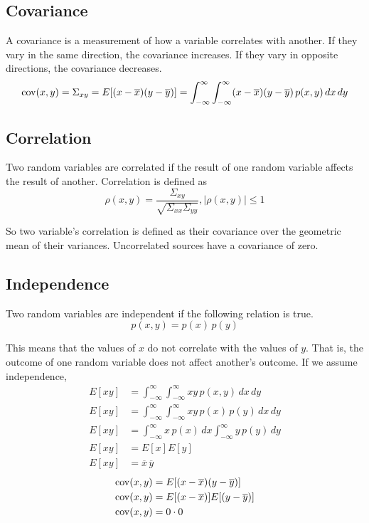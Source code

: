 \subsection{Covariance}

A covariance is a measurement of how a variable correlates with another. If they
vary in the same direction, the covariance increases. If they vary in opposite
directions, the covariance decreases.
\begin{equation*}
  \operatorname{cov}(x, y) = \Sigma_{xy} = E[(x - \overline{x})(y - \overline{y})] =
    \int_{-\infty}^\infty \int_{-\infty}^\infty (x - \overline{x})
    (y - \overline{y}) \,p(x, y) \,dx \,dy \\
\end{equation*}

\subsection{Correlation}

Two random variables are correlated if the result of one random variable affects
the result of another. Correlation is defined as
\begin{equation*}
  \rho(x, y) = \frac{\Sigma_{xy}}{\sqrt{\Sigma_{xx}\Sigma_{yy}}}, |\rho(x, y)|
    \leq 1
\end{equation*}

So two variable's correlation is defined as their covariance over the geometric
mean of their variances. Uncorrelated sources have a covariance of zero.

\subsection{Independence}

Two random variables are independent if the following relation is true.
\begin{equation*}
  p(x, y) = p(x) \,p(y)
\end{equation*}

This means that the values of $x$ do not correlate with the values of $y$. That
is, the outcome of one random variable does not affect another's outcome. If we
assume independence,
\begin{align*}
  E[xy] &= \int_{-\infty}^\infty \int_{-\infty}^\infty xy \,p(x, y) \,dx \,dy \\
  E[xy] &= \int_{-\infty}^\infty \int_{-\infty}^\infty xy \,p(x) \,p(y) \,dx
    \,dy \\
  E[xy] &= \int_{-\infty}^\infty x \,p(x) \,dx \int_{-\infty}^\infty y \,p(y)
    \,dy \\
  E[xy] &= E[x]E[y] \\
  E[xy] &= \overline{x}\,\overline{y}
\end{align*}
\begin{align*}
  \operatorname{cov}(x, y) &= E[(x - \overline{x})(y - \overline{y})] \\
  \operatorname{cov}(x, y) &= E[(x - \overline{x})]E[(y - \overline{y})] \\
  \operatorname{cov}(x, y) &= 0 \cdot 0 \\
\end{align*}

